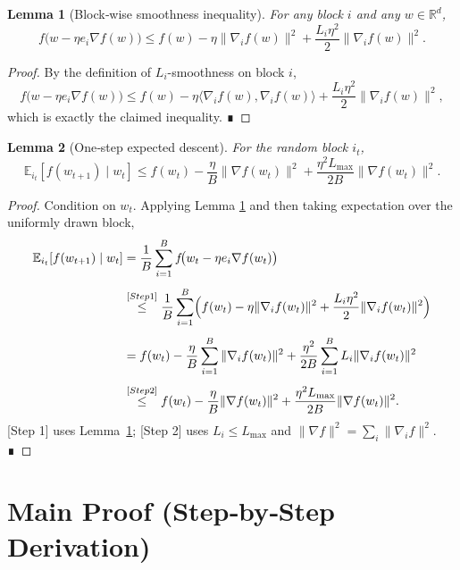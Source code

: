 \documentclass{article}
\newtheorem{lemma}{Lemma}
\newcommand{\E}{\mathbb{E}}
\newcommand{\R}{\mathbb{R}}
\begin{document}
\begin{lemma}[Block‑wise smoothness inequality]
\label{lem:smooth}
For any block $i$ and any $w\in\R^{d}$,
\[
f\!\bigl(w-\eta e_{i}\nabla f(w)\bigr)
\le f(w)-\eta\|\nabla_{i}f(w)\|^{2}
+\frac{L_{i}\eta^{2}}{2}\|\nabla_{i}f(w)\|^{2}.
\]
\end{lemma}
\begin{proof}
By the definition of $L_{i}$-smoothness on block $i$,
\[
f\!\bigl(w-\eta e_{i}\nabla f(w)\bigr)
\le f(w)-\eta\langle\nabla_{i}f(w),\nabla_{i}f(w)\rangle
+\frac{L_{i}\eta^{2}}{2}\|\nabla_{i}f(w)\|^{2},
\]
which is exactly the claimed inequality. ∎
\end{proof}

\begin{lemma}[One‑step expected descent]
\label{lem:expdescent}
For the random block $i_{t}$,
\[
\E_{i_{t}}\!\left[f(w_{t+1})\mid w_{t}\right]
\le f(w_{t})-\frac{\eta}{B}\|\nabla f(w_{t})\|^{2}
+\frac{\eta^{2}L_{\max}}{2B}\|\nabla f(w_{t})\|^{2}.
\]
\end{lemma}
\begin{proof}
Condition on $w_{t}$. Applying Lemma \ref{lem:smooth} and then taking
expectation over the uniformly drawn block,
\[
\begin{aligned}
\E_{i_{t}}\!\left[f(w_{t+1})\mid w_{t}\right]
&= \frac1B\sum_{i=1}^{B}
f\!\bigl(w_{t}-\eta e_{i}\nabla f(w_{t})\bigr)\\[4pt]
&\stackrel{[Step 1]}{\le}
\frac1B\sum_{i=1}^{B}\Bigl(
f(w_{t})-\eta\|\nabla_{i}f(w_{t})\|^{2}
+\frac{L_{i}\eta^{2}}{2}\|\nabla_{i}f(w_{t})\|^{2}
\Bigr)\\[4pt]
&= f(w_{t})-\frac{\eta}{B}\sum_{i=1}^{B}\|\nabla_{i}f(w_{t})\|^{2}
+\frac{\eta^{2}}{2B}\sum_{i=1}^{B}L_{i}\|\nabla_{i}f(w_{t})\|^{2}\\[4pt]
&\stackrel{[Step 2]}{\le}
f(w_{t})-\frac{\eta}{B}\|\nabla f(w_{t})\|^{2}
+\frac{\eta^{2}L_{\max}}{2B}\|\nabla f(w_{t})\|^{2}.
\end{aligned}
\]
[Step 1] uses Lemma~\ref{lem:smooth}; [Step 2] uses $L_{i}\le L_{\max}$
and $\|\nabla f\|^{2}= \sum_{i}\|\nabla_{i}f\|^{2}$. ∎
\end{proof}

\section*{Main Proof (Step‑by‑Step Derivation)}
\end{document}
